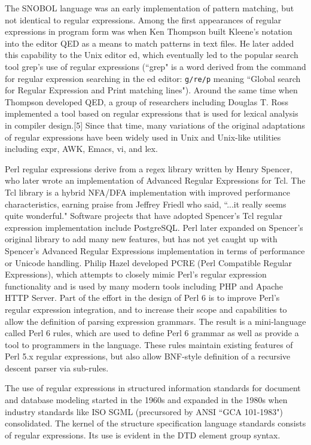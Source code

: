 The SNOBOL language was an early implementation of pattern matching, but not identical to regular expressions. Among the first appearances of regular expressions in program form was when Ken Thompson built Kleene's notation into the editor QED as a means to match patterns in text files. He later added this capability to the Unix editor ed, which eventually led to the popular search tool grep's use of regular expressions (``grep" is a word derived from the command for regular expression searching in the ed editor: \texttt{g/re/p} meaning ``Global search for Regular Expression and Print matching lines"). Around the same time when Thompson developed QED, a group of researchers including Douglas T. Ross implemented a tool based on regular expressions that is used for lexical analysis in compiler design.[5] Since that time, many variations of the original adaptations of regular expressions have been widely used in Unix and Unix-like utilities including expr, AWK, Emacs, vi, and lex.

Perl regular expressions derive from a regex library written by Henry Spencer, who later wrote an implementation of Advanced Regular Expressions for Tcl. The Tcl library is a hybrid NFA/DFA implementation with improved performance characteristics, earning praise from Jeffrey Friedl who said, ``...it really seems quite wonderful." Software projects that have adopted Spencer's Tcl regular expression implementation include PostgreSQL. Perl later expanded on Spencer's original library to add many new features, but has not yet caught up with Spencer's Advanced Regular Expressions implementation in terms of performance or Unicode handling. Philip Hazel developed PCRE (Perl Compatible Regular Expressions), which attempts to closely mimic Perl's regular expression functionality and is used by many modern tools including PHP and Apache HTTP Server. Part of the effort in the design of Perl 6 is to improve Perl's regular expression integration, and to increase their scope and capabilities to allow the definition of parsing expression grammars. The result is a mini-language called Perl 6 rules, which are used to define Perl 6 grammar as well as provide a tool to programmers in the language. These rules maintain existing features of Perl 5.x regular expressions, but also allow BNF-style definition of a recursive descent parser via sub-rules.

The use of regular expressions in structured information standards for document and database modeling started in the 1960s and expanded in the 1980s when industry standards like ISO SGML (precursored by ANSI ``GCA 101-1983") consolidated. The kernel of the structure specification language standards consists of regular expressions. Its use is evident in the DTD element group syntax.




